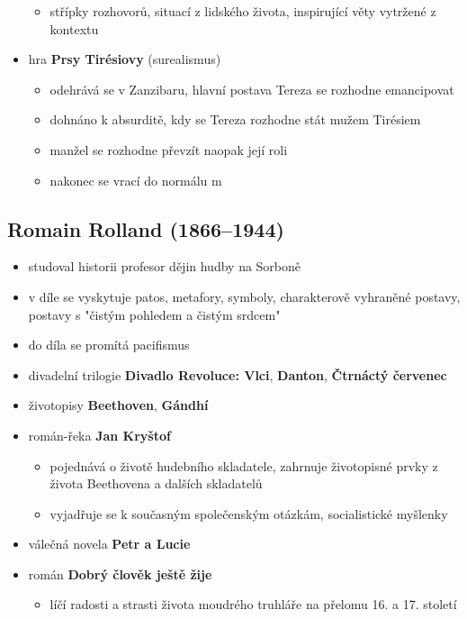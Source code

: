 \begin{itemize}
\begin{itemize}
	\item střípky rozhovorů, situací z lidského života, inspirující věty vytržené z kontextu
	\end{itemize}
\item hra \textbf{Prsy Tirésiovy} (surealismus)
	\begin{itemize}
	\item odehrává se v Zanzibaru, hlavní postava Tereza se rozhodne emancipovat
	\item dohnáno k absurditě, kdy se Tereza rozhodne stát mužem Tirésiem
	\item manžel se rozhodne převzít naopak její roli
	\item nakonec se vrací do normálu  m
	\end{itemize}
\end{itemize}

\subsection{Romain Rolland (1866--1944)}
\begin{itemize}
\item studoval historii \ra profesor dějin hudby na Sorboně
\item v díle se vyskytuje patos, metafory, symboly, charakterově vyhraněné postavy, postavy s "čistým pohledem a čistým srdcem"
\item do díla se promítá pacifismus
\item divadelní trilogie \textbf{Divadlo Revoluce: Vlci}, \textbf{Danton}, \textbf{Čtrnáctý červenec}
\item životopisy \textbf{Beethoven}, \textbf{Gándhí}
\item román-řeka \textbf{Jan Kryštof}
	 \begin{itemize}
	 \item pojednává o životě hudebního skladatele, zahrnuje životopisné prvky z života Beethovena a dalších skladatelů
	 \item vyjadřuje se k současným společenským otázkám, socialistické myšlenky
	 \end{itemize}
\item válečná novela \textbf{Petr a Lucie}
\item román \textbf{Dobrý člověk ještě žije}
	\begin{itemize}
	\item líčí radosti a strasti života moudrého truhláře na přelomu 16. a 17. století
	\end{itemize}
\end{itemize}

